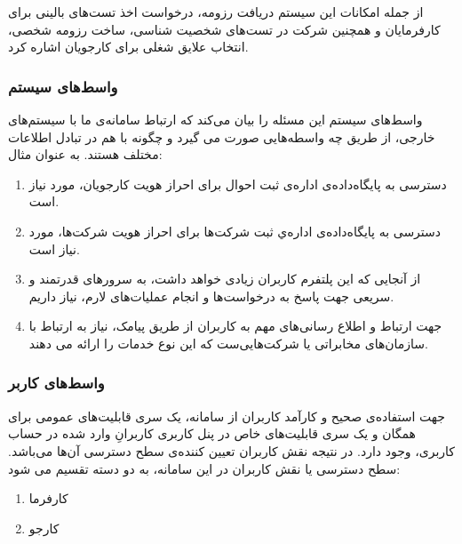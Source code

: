 \documentclass{report}
\begin{document}
				از جمله امکانات این سیستم دریافت رزومه، درخواست اخذ تست‌های بالینی برای کارفرمایان و همچنین شرکت در تست‌های شخصیت شناسی، ساخت رزومه شخصی، انتخاب علایق شغلی برای کارجویان اشاره کرد.
				
				\subsubsection{واسط‌های سیستم}
					واسط‌های سیستم این مسئله را بیان می‌کند که ارتباط سامانه‌ی ما با سیستم‌های خارجی، از طریق چه واسطه‌هایی صورت می گیرد و چگونه با هم در تبادل اطلاعات مختلف هستند. به عنوان مثال:
					\begin{enumerate}
						\item 
	دسترسی به پایگاه‌داده‌ی اداره‌ی ثبت احوال برای احراز هویت کارجو‌یان، مورد نیاز است.
						\item 
	دسترسی به پایگاه‌داده‌ی اداره‌ي ثبت شرکت‌ها برای احراز هویت شرکت‌ها، مورد نیاز است.
						\item 
	از آنجایی که این پلتفرم کاربران زیادی خواهد داشت، به سرور‌های قدرتمند و سریعی جهت پاسخ به درخواست‌ها و انجام عملیات‌های لارم، نیاز داریم.
						\item 
	جهت ارتباط و اطلاع رسانی‌های مهم به کاربران از طریق پیامک، نیاز به ارتباط با سازمان‌های مخابراتی یا شرکت‌هایی‌ست که این نوع خدمات را ارائه می دهند.
					\end{enumerate}
				\subsubsection{واسط‌های کاربر}
					جهت استفاده‌ی صحیح و کارآمد کاربران از سامانه، یک سری قابلیت‌های عمومی برای همگان و یک سری قابلیت‌های خاص در پنل کاربری کاربرانِ وارد شده در حساب کاربری، وجود دارد. در نتیجه نقش کاربران تعیین کننده‌ی سطح دسترسی آن‌ها می‌باشد. 
					سطح‌ دسترسی یا نقش کاربران در این سامانه، به دو دسته تقسیم می شود:
					\begin{enumerate}
						\item کارفرما
						\item کارجو
					\end{enumerate}
\end{document}
